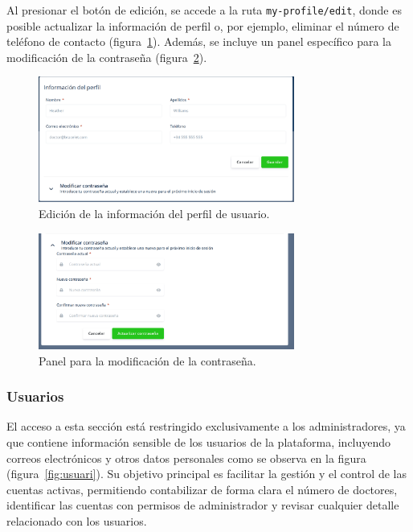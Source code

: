 \documentclass[12pt, a4paper]{article}
\begin{document}
\begin{umaappendices}
	Al presionar el botón de edición, se accede a la ruta \texttt{my-profile/edit}, donde es posible actualizar la información de perfil o, por ejemplo, eliminar el número de teléfono de contacto (figura~\ref{fig:perf}). Además, se incluye un panel específico para la modificación de la contraseña (figura~\ref{fig:lol}).
	
	\begin{figure}[htbp]
		\centering
		\includegraphics[width=0.75\textwidth]{images/13_perfil2.png}
		\caption[Ejemplo]{Edición de la información del perfil de usuario.}
		\label{fig:perf}
	\end{figure}

	\begin{figure}[htbp]
		\centering
		\includegraphics[width=0.75\textwidth]{images/13_perfil3.png}
		\caption[Ejemplo]{Panel para la modificación de la contraseña.}
		\label{fig:lol}
	\end{figure}

\subsubsection{Usuarios}
El acceso a esta sección está restringido exclusivamente a los administradores, ya que contiene información sensible de los usuarios de la plataforma, incluyendo correos electrónicos y otros datos personales como se observa en la figura (figura~\ref{fig:usuari}). Su objetivo principal es facilitar la gestión y el control de las cuentas activas, permitiendo contabilizar de forma clara el número de doctores, identificar las cuentas con permisos de administrador y revisar cualquier detalle relacionado con los usuarios.


\end{umaappendices}
\end{document}
